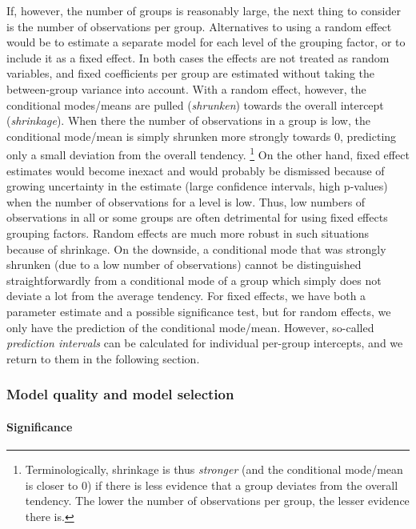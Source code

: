 If, however, the number of groups is reasonably large, the next thing to consider is the number of observations per group.
Alternatives to using a random effect would be to estimate a separate model for each level of the grouping factor, or to include it as a fixed effect.
In both cases the effects are not treated as random variables, and fixed coefficients per group are estimated without taking the between-group variance into account.
With a random effect, however, the conditional modes\slash means are pulled (\textit{shrunken}) towards the overall intercept (\textit{shrinkage}).
When there the number of observations in a group is low, the conditional mode\slash mean is simply shrunken more strongly towards $0$, predicting only a small deviation from the overall tendency.%
\footnote{Terminologically, shrinkage is thus \textit{stronger} (and the conditional mode\slash mean is closer to $0$) if there is less evidence that a group deviates from the overall tendency.
The lower the number of observations per group, the lesser evidence there is.}
On the other hand, fixed effect estimates would become inexact and would probably be dismissed because of growing uncertainty in the estimate (large confidence intervals, high p-values) when the number of observations for a level is low.
Thus, low numbers of observations in all or some groups are often detrimental for using fixed effects grouping factors.
Random effects are much more robust in such situations because of shrinkage.
On the downside, a conditional mode that was strongly shrunken (due to a low number of observations) cannot be distinguished straightforwardly from a conditional mode of a group which simply does not deviate a lot from the average tendency.
For fixed effects, we have both a parameter estimate and a possible significance test, but for random effects, we only have the prediction of the conditional mode\slash mean.
However, so-called \textit{prediction intervals} can be calculated for individual per-group intercepts, and we return to them in the following section.


\subsubsection{Model quality and model selection}
\label{sec:significancetestingandcoefficientsofdetermination}

\paragraph{Significance}

